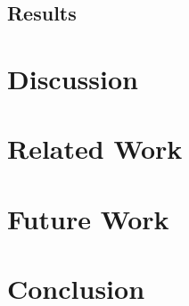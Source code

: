 \documentclass[12pt]{article}
\begin{document}
\subsection{Results}

\section{Discussion}

\section{Related Work}

\section{Future Work}

\section{Conclusion}



\end{document}
